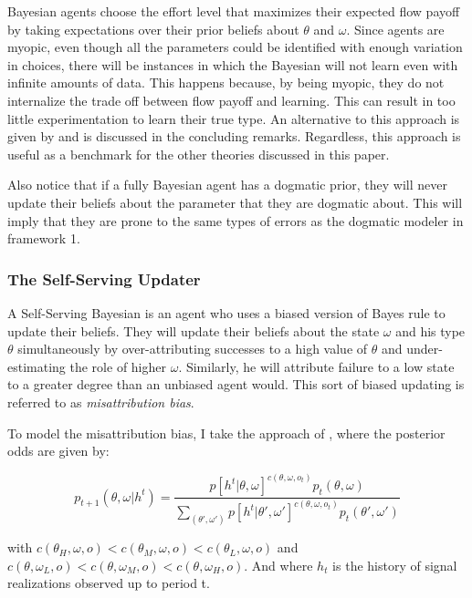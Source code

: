 \documentclass[
  12pt,
]{article}
\begin{document}
Bayesian agents choose the effort level that maximizes their expected
flow payoff by taking expectations over their prior beliefs about
\(\theta\) and \(\omega\). Since agents are myopic, even though all the
parameters could be identified with enough variation in choices, there
will be instances in which the Bayesian will not learn even with
infinite amounts of data. This happens because, by being myopic, they do
not internalize the trade off between flow payoff and learning. This can
result in too little experimentation to learn their true type. An
alternative to this approach is given by \citet{Hestermann2021} and is
discussed in the concluding remarks. Regardless, this approach is useful
as a benchmark for the other theories discussed in this paper.

Also notice that if a fully Bayesian agent has a dogmatic prior, they
will never update their beliefs about the parameter that they are
dogmatic about. This will imply that they are prone to the same types of
errors as the dogmatic modeler in framework 1.

\hypertarget{the-self-serving-updater}{%
\subsubsection{The Self-Serving
Updater}\label{the-self-serving-updater}}

A Self-Serving Bayesian is an agent who uses a biased version of Bayes
rule to update their beliefs. They will update their beliefs about the
state \(\omega\) and his type \(\theta\) simultaneously by
over-attributing successes to a high value of \(\theta\) and
under-estimating the role of higher \(\omega\). Similarly, he will
attribute failure to a low state to a greater degree than an unbiased
agent would. This sort of biased updating is referred to as
\emph{misattribution bias}.

To model the misattribution bias, I take the approach of
\citet{benjamin2019}, where the posterior odds are given by:

\[
p_{t+1}(\theta, \omega| h^t) = \frac{p[h^t|\theta, \omega]^{c(\theta, \omega, o_t)}p_t(\theta, \omega)}{\sum_{(\theta', \omega')}p[h^t|\theta', \omega']^{c(\theta, \omega, o_t)}p_t(\theta', \omega')}
\]

with
\(c(\theta_H, \omega, o)<c(\theta_M, \omega, o)<c(\theta_L, \omega, o)\)
and
\(c(\theta, \omega_L, o)<c(\theta, \omega_M, o)<c(\theta, \omega_H, o)\).
And where \(h_t\) is the history of signal realizations observed up to
period t.
\end{document}
